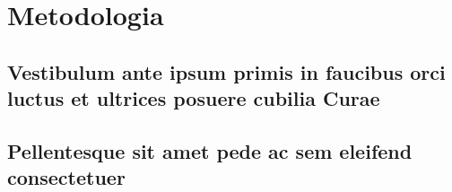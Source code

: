 
\chapter{Metodologia}

\section{Vestibulum ante ipsum primis in faucibus orci luctus et ultrices
posuere cubilia Curae}

\lipsum[21-22]

\section{Pellentesque sit amet pede ac sem eleifend consectetuer}

\lipsum[24]
